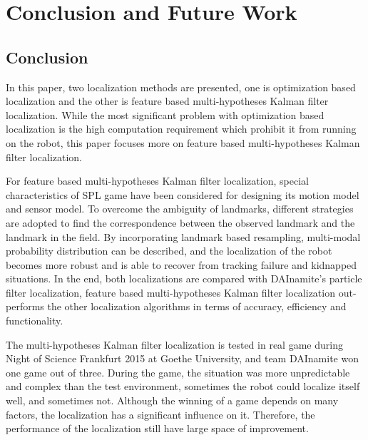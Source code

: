 \chapter{Conclusion and Future Work\label{cha:chapter7}}

\section{Conclusion\label{sec:conclusion}}
In this paper, two localization methods are presented, one is optimization based localization and the other is feature based multi-hypotheses Kalman filter localization. While the most significant problem with optimization based localization is the high computation requirement which prohibit it from running on the robot, this paper focuses more on feature based multi-hypotheses Kalman filter localization. 

For feature based multi-hypotheses Kalman filter localization, special characteristics of \gls{SPL} game have been considered for designing its motion model and sensor model. To overcome the ambiguity of landmarks, different strategies are adopted to find the correspondence between the observed landmark and the landmark in the field. By incorporating landmark based resampling, multi-modal probability distribution can be described, and the localization of the robot becomes more robust and is able to recover from tracking failure and kidnapped situations. In the end, both localizations are compared with DAInamite's particle filter localization, feature based  multi-hypotheses Kalman filter localization out-performs the other localization algorithms in terms of accuracy, efficiency and functionality. 

The multi-hypotheses Kalman filter localization is tested in real game during Night of Science Frankfurt 2015 at Goethe University, and team DAInamite won one game out of three. During the game, the situation was more unpredictable and complex than the test environment, sometimes the robot could localize itself well, and sometimes not. Although the winning of a game depends on many factors, the localization has a significant influence on it. Therefore, the performance of the localization still have large space of improvement.  

